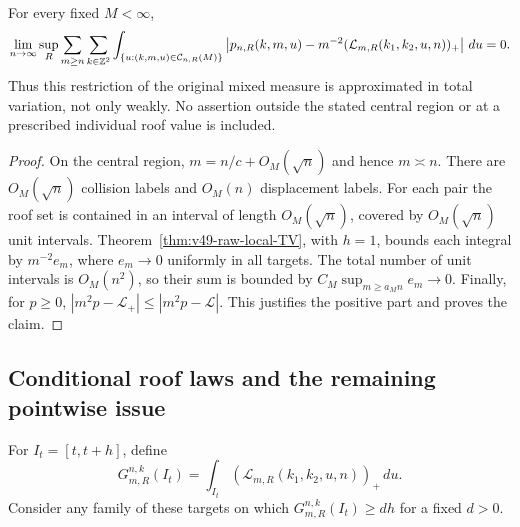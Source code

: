 \begin{corollary}
\label{cor:v49-mixed-TV}
For every fixed $M<\infty$,
\begin{align}
 \lim_{n\to\infty}\sup_R
 \sum_{m\ge n}\sum_{k\in\Z^2}
 \int_{\{u:(k,m,u)\in\mathcal C_{n,R}(M)\}}
 \left|p_{n,R}(k,m,u)
       -m^{-2}(\mathcal L_{m,R}(k_1,k_2,u,n))_+\right|\,du=0.
                                      \label{eq:v49-mixed-TV}
\end{align}
Thus this restriction of the original mixed measure is approximated
in total variation, not only weakly. No assertion outside the stated
central region or at a prescribed individual roof value is included.
\end{corollary}
\begin{proof}
On the central region, $m=n/c+O_M(\sqrt n)$ and hence $m\asymp n$.
There are $O_M(\sqrt n)$ collision labels and $O_M(n)$ displacement
labels. For each pair the roof set is contained in an interval of
length $O_M(\sqrt n)$, covered by $O_M(\sqrt n)$ unit intervals.
Theorem~\ref{thm:v49-raw-local-TV}, with $h=1$, bounds each integral
by $m^{-2}e_m$, where $e_m\to0$ uniformly in all targets. The total
number of unit intervals is $O_M(n^2)$, so their sum is bounded by
$C_M\sup_{m\ge a_M n}e_m\to0$. Finally, for $p\ge0$,
$|m^2p-\mathcal L_+|\le|m^2p-\mathcal L|$. This justifies the
positive part and proves the claim.
\end{proof}

\subsection{Conditional roof laws and the remaining pointwise issue}
For $I_t=[t,t+h]$, define
\[
 G_{m,R}^{n,k}(I_t)=\int_{I_t}
                    (\mathcal L_{m,R}(k_1,k_2,u,n))_+\,du.
\]
Consider any family of these targets on which
$G_{m,R}^{n,k}(I_t)\ge d h$ for a fixed $d>0$.

